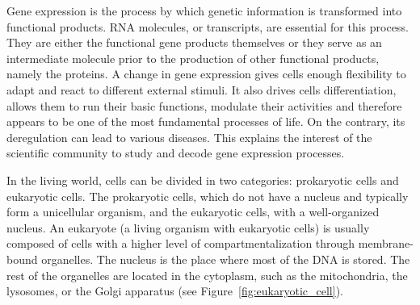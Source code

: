
Gene expression is the process by which genetic information is transformed into functional products.
\ac{RNA} molecules, or transcripts, are essential for this process.
They are either the functional gene products themselves or they serve as an intermediate molecule prior to the production of other functional products, namely the proteins.
A change in gene expression gives cells enough flexibility to adapt and react to different external stimuli.
It also drives cells differentiation, allows them to run their basic functions, modulate their activities and therefore appears to be one of the most fundamental processes of life.
On the contrary, its deregulation can lead to various diseases.
This explains the interest of the scientific community to study and decode gene expression processes.

In the living world, cells can be divided in two categories: prokaryotic cells and eukaryotic cells.
The prokaryotic cells, which do not have a nucleus and typically form a unicellular organism, and the eukaryotic cells, with a well-organized nucleus.
An eukaryote (a living organism with eukaryotic cells) is usually composed of cells with a higher level of compartmentalization through membrane-bound organelles.
The nucleus is the place where most of the \ac{DNA} is stored.
The rest of the organelles are located in the cytoplasm, such as the mitochondria, the lysosomes, or the Golgi apparatus (see Figure~\ref{fig:eukaryotic_cell}).

